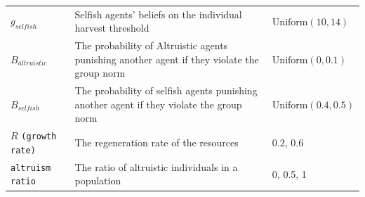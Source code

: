 \begin{table}[t]
\begin{tabularx}{\textwidth}{p{}Xp{}}
    $g_{selfish}$ & Selfish agents' beliefs on the individual harvest threshold      & $\textrm{Uniform}(10,14)$ \\
    $B_{altruistic}$ & The probability of Altruistic agents punishing another agent if they violate the group norm  & $\textrm{Uniform}(0,0.1)$ \\
    $B_{selfish}$ & The probability of selfish agents punishing another agent if they violate the group norm  & $\textrm{Uniform}(0.4,0.5)$ \\
    $R$ \texttt{(growth rate)} & The regeneration rate of the resources  & 0.2, 0.6 \\
    \texttt{altruism ratio} & The ratio of altruistic individuals in a population  & 0, 0.5, 1  \\
    \bottomrule
    \end{tabularx}
\end{table}